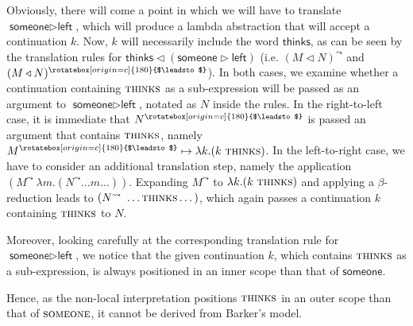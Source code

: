 \documentclass[]{article}
\newcommand{\W}[1]{\textsf{#1}}
\newcommand{\lrline}[1]{#1^{\leadsto}}
\newcommand{\rlline}[1]{#1^{\rotatebox[origin=c]{180}{$\leadsto$}}}
\newcommand{\AppR}{\mathbin{\triangleleft}}
\newcommand{\AppL}{\mathbin{\triangleright}}
\newcommand{\la}{\lambda}
\begin{document}
Obviously, there will come a point in which we will have to translate $\W{someone}\AppL\W{left}$, which will produce a lambda abstraction that will accept a continuation $k$. Now, $k$ will necessarily include the word $\W{thinks}$, as can be seen by the translation rules for $\W{thinks}\AppR(\W{someone}\AppL\W{left})$ (i.e. $\lrline{(M\AppR N)}$ and $\rlline{(M\AppR N)}$). In both cases, we examine whether a continuation containing $\textsc{thinks}$ as a sub-expression will be passed as an argument to $\W{someone}\AppL\W{left}$, notated as $N$ inside the rules. In the right-to-left case, it is immediate that $\rlline{N}$ is passed an argument that contains $\textsc{thinks}$, namely $\rlline{M} \mapsto \la k.(k\ \textsc{thinks})$. In the left-to-right case, we have to consider an additional translation step, namely the application $(\lrline{M}\ \la m.(\lrline{N} \dots m \dots))$. Expanding $\lrline{M}$ to $\la k.(k\ \textsc{thinks})$ and applying a $\beta$-reduction leads to $(\lrline{N}\ \dots \textsc{thinks} \dots)$, which again passes a continuation $k$ containing $\textsc{thinks}$ to $N$.
	
Moreover, looking carefully at the corresponding translation rule for $\W{someone}\AppL\W{left}$, we notice that the given continuation $k$, which contains $\textsc{thinks}$ as a sub-expression, is always positioned in an inner scope than that of $\W{someone}$.

Hence, as the non-local interpretation positions $\textsc{thinks}$ in an outer scope than that of $\textsc{someone}$, it cannot be derived from Barker's model.

\newpage
\end{document}
